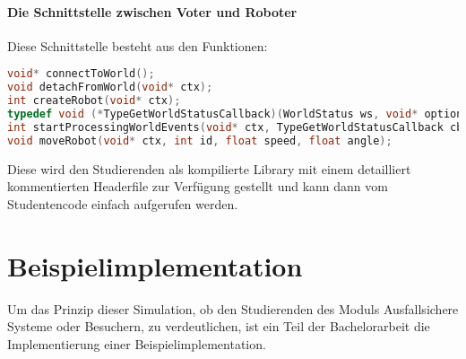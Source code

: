 \paragraph{Die Schnittstelle zwischen Voter und Roboter} Diese Schnittstelle besteht aus den Funktionen:
\begin{lstlisting}[frame=single, language=c] 
void* connectToWorld();
void detachFromWorld(void* ctx);
int createRobot(void* ctx);
typedef void (*TypeGetWorldStatusCallback)(WorldStatus ws, void* optional);
int startProcessingWorldEvents(void* ctx, TypeGetWorldStatusCallback cb, void* optional);
void moveRobot(void* ctx, int id, float speed, float angle);
\end{lstlisting}

Diese wird den Studierenden als kompilierte Library mit einem detailliert kommentierten Headerfile zur Verf{\"{u}}gung gestellt und kann
dann vom Studentencode einfach aufgerufen werden.


\clearpage
\section{Beispielimplementation}
Um das Prinzip dieser Simulation, ob den Studierenden des Moduls Ausfallsichere Systeme oder Besuchern, zu verdeutlichen, ist ein Teil der Bachelorarbeit die Implementierung einer
Beispielimplementation.


